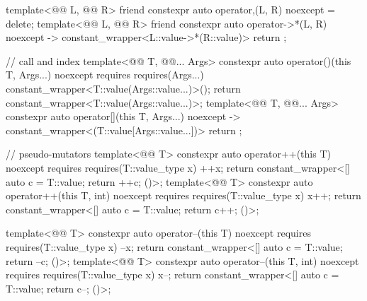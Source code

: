 \begin{codeblock}
{  template<@@ L, @@ R>
    friend constexpr auto operator,(L, R) noexcept = delete;
  template<@@ L, @@ R>
    friend constexpr auto operator->*(L, R) noexcept -> constant_wrapper<L::value->*(R::value)>
      { return {}; }

  // call and index
  template<@@ T, @@... Args>
    constexpr auto operator()(this T, Args...) noexcept
      requires requires(Args...) { constant_wrapper<T::value(Args::value...)>(); }
        { return constant_wrapper<T::value(Args::value...)>{}; }
  template<@@ T, @@... Args>
    constexpr auto operator[](this T, Args...) noexcept
       -> constant_wrapper<(T::value[Args::value...])>
        { return {}; }

  // pseudo-mutators
  template<@@ T>
    constexpr auto operator++(this T) noexcept
      requires requires(T::value_type x) { ++x; }
        { return constant_wrapper<[] { auto c = T::value; return ++c; }()>{}; }
  template<@@ T>
    constexpr auto operator++(this T, int) noexcept
      requires requires(T::value_type x) { x++; }
        { return constant_wrapper<[] { auto c = T::value; return c++; }()>{}; }

  template<@@ T>
    constexpr auto operator--(this T) noexcept
      requires requires(T::value_type x) { --x; }
        { return constant_wrapper<[] { auto c = T::value; return --c; }()>{}; }
  template<@@ T>
    constexpr auto operator--(this T, int) noexcept
      requires requires(T::value_type x) { x--; }
        { return constant_wrapper<[] { auto c = T::value; return c--; }()>{}; }

}
\end{codeblock}
